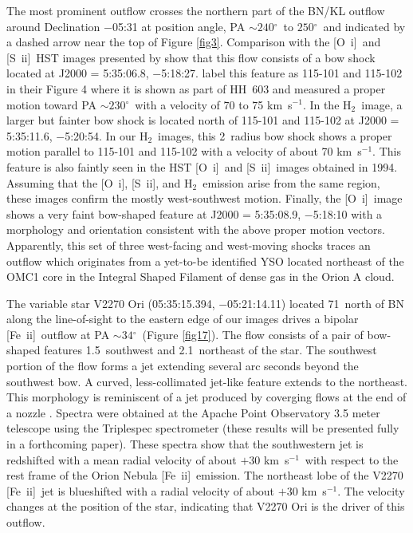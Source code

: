 \documentclass{aa}
\newcommand\arcdeg{\mbox{$^\circ$}\xspace}  %
\newcommand{\kms}{km~s{$^{-1}$}}
\newcommand{\sii}{[S~{\sc ii]}}
\newcommand{\Feii}{[Fe~{\sc ii}]}
\newcommand{\oi}{[O~{\sc i}]}
\newcommand{\hh}{\ensuremath{\textrm{H}_{2}}}			%
\begin{document}
The most prominent outflow crosses the 
northern part of the BN/KL outflow around Declination $-$05:31 at position
angle, PA $\sim 240$\arcdeg\ to $250$\arcdeg\ and indicated by a
dashed arrow  near the top of Figure \ref{fig3}.   Comparison with the  \oi\  
and \sii\   HST images presented  by \citet{Doi2002}  show that this flow 
consists of  a bow shock located at  J2000 = 5:35:06.8, $-$5:18:27. 
\citet{Doi2002} label this feature as 115-101 and 115-102 in their Figure 4 where
it is shown as part of HH~603 and measured a proper motion toward   
PA $\sim 230$\arcdeg\ with a velocity of 70 to 75 \kms .  In the \hh\ image, 
a larger  but fainter bow shock is located north of 115-101 and 115-102 at 
J2000 = 5:35:11.6, $-$5:20:54.  In our \hh\ images, this 2\arcsec\  radius
bow shock shows a proper motion parallel to 115-101 and 115-102 with 
a velocity of about 70 \kms .   This feature is also faintly seen in the  
HST \oi\  and \sii\ images obtained in 1994.    Assuming that the \oi , \sii , 
and \hh\ emission arise from the same region, these images confirm the mostly 
west-southwest motion.
Finally, the \oi\ image shows a very faint bow-shaped feature at 
J2000 = 5:35:08.9, $-$5:18:10 with a morphology and orientation consistent
with the above proper motion vectors.   Apparently, this set of three west-facing
and west-moving shocks traces an outflow which originates from a yet-to-be 
identified YSO located  northeast of the OMC1 core in the Integral 
Shaped Filament of dense gas in the Orion A cloud.

The variable star  V2270 Ori (05:35:15.394, $-$05:21:14.11) located 71\arcsec\ 
north of BN along the line-of-sight to the eastern edge of our images drives a bipolar 
\Feii\ outflow at PA $\sim 34$\arcdeg\ (Figure \ref{fig17}).    The flow consists of
a pair of bow-shaped features  1.5\arcsec\ southwest and 2.1\arcsec\ northeast
of the star.   The southwest portion of the flow forms a jet  extending 
several arc seconds  beyond the southwest bow.  A curved, less-collimated 
jet-like feature extends to the northeast.   This morphology is reminiscent
of a jet produced by coverging flows at the end of a nozzle 
\citep{Canto_nozzle1980, Canto1981}.
Spectra were obtained at the Apache Point Observatory 3.5 meter telescope using
the Triplespec spectrometer (these results will be presented fully in
a forthcoming paper).  These spectra show that the southwestern jet  is
redshifted with a mean radial velocity of about
$+30$ \kms\ with respect to the rest frame of the Orion Nebula \Feii\ emission.
The northeast lobe of the V2270 \Feii\ jet is blueshifted with a radial velocity
of about $+30$ \kms .   The velocity changes 
at the position of the star, indicating that V2270 Ori is the driver of this outflow.  
\end{document}
